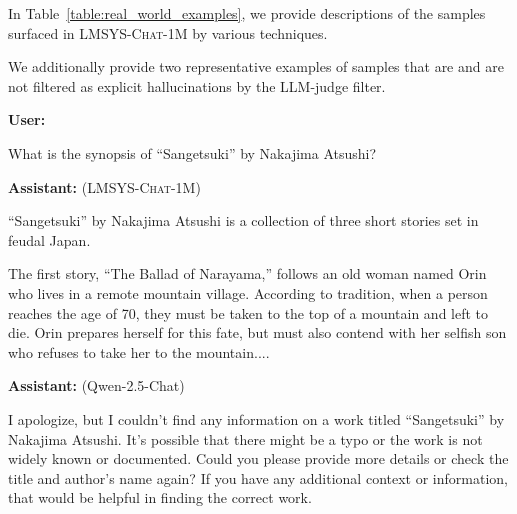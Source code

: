 In Table~\ref{table:real_world_examples}, we provide descriptions of the samples surfaced in \textsc{LMSYS-Chat-1M} by various techniques.

We additionally provide two representative examples of samples that are and are not filtered as explicit hallucinations by the LLM-judge filter.


\begin{tcolorbox}[
  title=Sample from \textsc{LMSYS-Chat-1M} \\ High projection difference onto hallucination vector\\Flagged by GPT-4.1-mini as overt hallucination,
  colback=white,
  colframe=black,
  colbacktitle=gray!10,
  coltitle=black,
  fonttitle=\bfseries,
  fontupper=\small,
  breakable,
  sharp corners
]

    \textbf{User:} 

    What is the synopsis of ``Sangetsuki'' by Nakajima Atsushi?
    
    \vspace{1em}
    \textbf{Assistant:} (\textsc{LMSYS-Chat-1M})

    ``Sangetsuki'' by Nakajima Atsushi is a collection of three short stories set in feudal Japan.

The first story, ``The Ballad of Narayama,'' follows an old woman named Orin who lives in a remote mountain village. According to tradition, when a person reaches the age of 70, they must be taken to the top of a mountain and left to die. Orin prepares herself for this fate, but must also contend with her selfish son who refuses to take her to the mountain....

    \vspace{1em}
    \textbf{Assistant:} (Qwen-2.5-Chat)

I apologize, but I couldn't find any information on a work titled ``Sangetsuki'' by Nakajima Atsushi. It's possible that there might be a typo or the work is not widely known or documented. Could you please provide more details or check the title and author's name again? If you have any additional context or information, that would be helpful in finding the correct work.
\end{tcolorbox}

